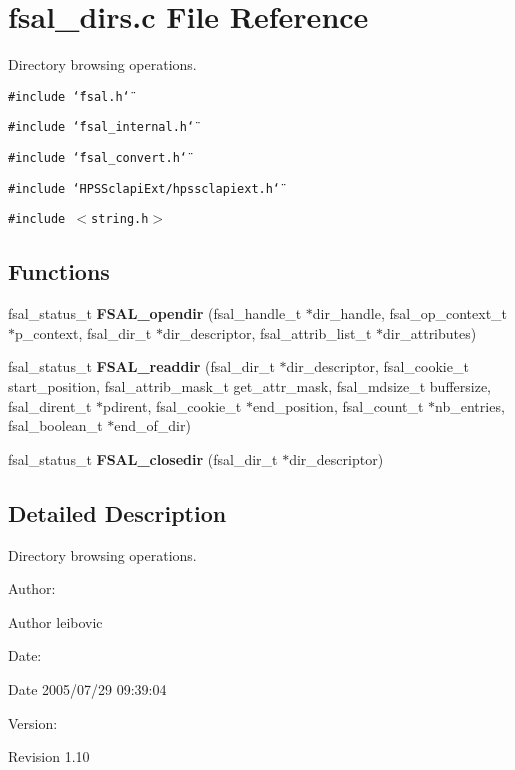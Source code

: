 \section{fsal\_\-dirs.c File Reference}
\label{fsal__dirs_8c}
Directory browsing operations.  


{\tt \#include \char`\"{}fsal.h\char`\"{}}\par
{\tt \#include \char`\"{}fsal\_\-internal.h\char`\"{}}\par
{\tt \#include \char`\"{}fsal\_\-convert.h\char`\"{}}\par
{\tt \#include \char`\"{}HPSSclapiExt/hpssclapiext.h\char`\"{}}\par
{\tt \#include $<$string.h$>$}\par
\subsection*{Functions}
\begin{CompactItemize}
\item 
fsal\_\-status\_\-t {\bf FSAL\_\-opendir} (fsal\_\-handle\_\-t $\ast$dir\_\-handle, fsal\_\-op\_\-context\_\-t $\ast$p\_\-context, fsal\_\-dir\_\-t $\ast$dir\_\-descriptor, fsal\_\-attrib\_\-list\_\-t $\ast$dir\_\-attributes)
\item 
fsal\_\-status\_\-t {\bf FSAL\_\-readdir} (fsal\_\-dir\_\-t $\ast$dir\_\-descriptor, fsal\_\-cookie\_\-t start\_\-position, fsal\_\-attrib\_\-mask\_\-t get\_\-attr\_\-mask, fsal\_\-mdsize\_\-t buffersize, fsal\_\-dirent\_\-t $\ast$pdirent, fsal\_\-cookie\_\-t $\ast$end\_\-position, fsal\_\-count\_\-t $\ast$nb\_\-entries, fsal\_\-boolean\_\-t $\ast$end\_\-of\_\-dir)
\item 
fsal\_\-status\_\-t {\bf FSAL\_\-closedir} (fsal\_\-dir\_\-t $\ast$dir\_\-descriptor)
\end{CompactItemize}


\subsection{Detailed Description}
Directory browsing operations. 

\begin{Desc}
\item[Author:]\end{Desc}
\begin{Desc}
\item[Author]leibovic \end{Desc}
\begin{Desc}
\item[Date:]\end{Desc}
\begin{Desc}
\item[Date]2005/07/29 09:39:04 \end{Desc}
\begin{Desc}
\item[Version:]\end{Desc}
\begin{Desc}
\item[Revision]1.10 \end{Desc}


